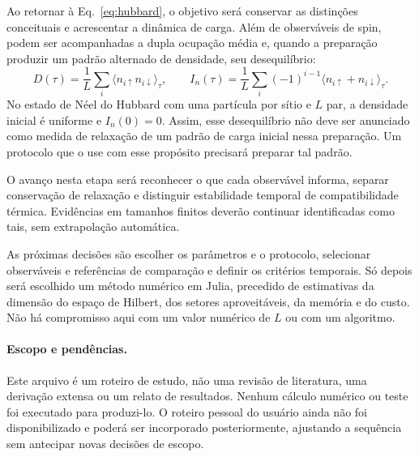 \documentclass[a4paper,11pt]{article}
\begin{document}
Ao retornar à Eq.~\eqref{eq:hubbard}, o objetivo será conservar as
distinções conceituais e acrescentar a dinâmica de carga. Além de
observáveis de spin, podem ser acompanhadas a dupla ocupação média
e, quando a preparação produzir um padrão alternado de densidade,
seu desequilíbrio:
\begin{equation}
  D(\tau)=\frac{1}{L}\sum_i
    \langle n_{i\uparrow}n_{i\downarrow}\rangle_\tau,
  \qquad
  I_n(\tau)=\frac{1}{L}\sum_i(-1)^{i-1}
    \langle n_{i\uparrow}+n_{i\downarrow}\rangle_\tau.
\end{equation}
No estado de Néel do Hubbard com uma partícula por sítio e $L$ par,
a densidade inicial é uniforme e $I_n(0)=0$. Assim, esse desequilíbrio
não deve ser anunciado como medida de relaxação de um padrão de carga
inicial nessa preparação. Um protocolo que o use com esse propósito
precisará preparar tal padrão.

O avanço nesta etapa será reconhecer o que cada observável informa,
separar conservação de relaxação e distinguir estabilidade temporal
de compatibilidade térmica. Evidências em tamanhos finitos deverão
continuar identificadas como tais, sem extrapolação automática.

As próximas decisões são escolher os parâmetros e o protocolo,
selecionar observáveis e referências de comparação e definir os
critérios temporais. Só depois será escolhido um método numérico em
Julia, precedido de estimativas da dimensão do espaço de Hilbert,
dos setores aproveitáveis, da memória e do custo. Não há compromisso
aqui com um valor numérico de $L$ ou com um algoritmo.

\paragraph{Escopo e pendências.}
Este arquivo é um roteiro de estudo, não uma revisão de literatura,
uma derivação extensa ou um relato de resultados. Nenhum cálculo
numérico ou teste foi executado para produzi-lo. O roteiro pessoal
do usuário ainda não foi disponibilizado e poderá ser incorporado
posteriormente, ajustando a sequência sem antecipar novas decisões
de escopo.
\end{document}
